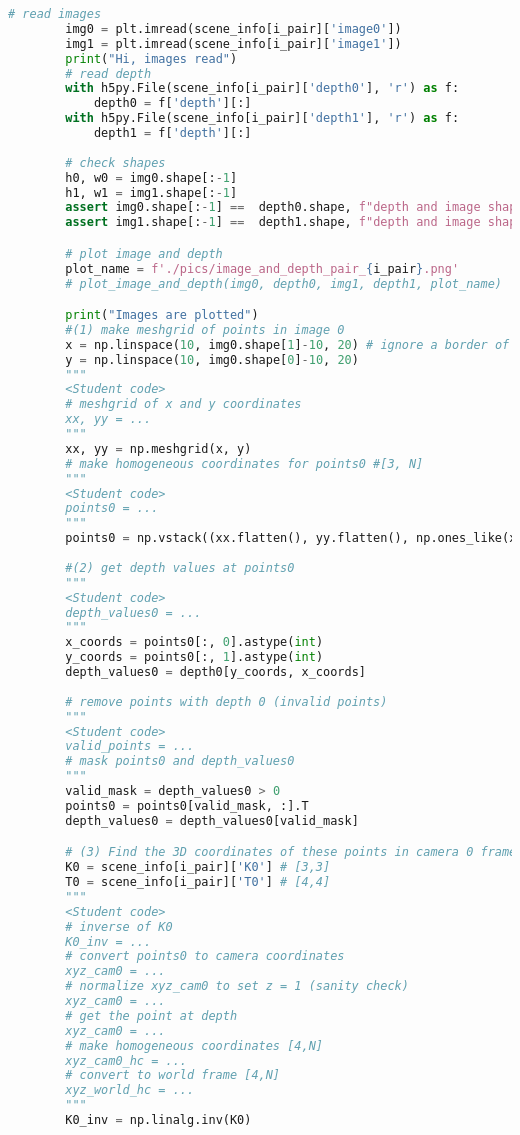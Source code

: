 \documentclass{article}
\begin{document}
\begin{lstlisting}[language=Python]
        # read images
        img0 = plt.imread(scene_info[i_pair]['image0'])
        img1 = plt.imread(scene_info[i_pair]['image1'])
        print("Hi, images read")
        # read depth
        with h5py.File(scene_info[i_pair]['depth0'], 'r') as f:
            depth0 = f['depth'][:]
        with h5py.File(scene_info[i_pair]['depth1'], 'r') as f:
            depth1 = f['depth'][:]
            
        # check shapes
        h0, w0 = img0.shape[:-1]
        h1, w1 = img1.shape[:-1]
        assert img0.shape[:-1] ==  depth0.shape, f"depth and image shapes do not match: {img0}, {depth0}"
        assert img1.shape[:-1] ==  depth1.shape, f"depth and image shapes do not match: {img1}, {depth1}"

        # plot image and depth            
        plot_name = f'./pics/image_and_depth_pair_{i_pair}.png'
        # plot_image_and_depth(img0, depth0, img1, depth1, plot_name)      

        print("Images are plotted")
        #(1) make meshgrid of points in image 0
        x = np.linspace(10, img0.shape[1]-10, 20) # ignore a border of 10 pxls
        y = np.linspace(10, img0.shape[0]-10, 20)
        """
        <Student code>
        # meshgrid of x and y coordinates
        xx, yy = ...
        """
        xx, yy = np.meshgrid(x, y)
        # make homogeneous coordinates for points0 #[3, N]
        """
        <Student code>
        points0 = ...
        """
        points0 = np.vstack((xx.flatten(), yy.flatten(), np.ones_like(xx.flatten()))).transpose(1, 0)
        
        #(2) get depth values at points0
        """
        <Student code>
        depth_values0 = ...
        """
        x_coords = points0[:, 0].astype(int)
        y_coords = points0[:, 1].astype(int)
        depth_values0 = depth0[y_coords, x_coords]
        
        # remove points with depth 0 (invalid points)
        """
        <Student code>
        valid_points = ...
        # mask points0 and depth_values0
        """
        valid_mask = depth_values0 > 0
        points0 = points0[valid_mask, :].T
        depth_values0 = depth_values0[valid_mask]

        # (3) Find the 3D coordinates of these points in camera 0 frame
        K0 = scene_info[i_pair]['K0'] # [3,3]
        T0 = scene_info[i_pair]['T0'] # [4,4]
        """
        <Student code>
        # inverse of K0
        K0_inv = ...
        # convert points0 to camera coordinates
        xyz_cam0 = ...
        # normalize xyz_cam0 to set z = 1 (sanity check)
        xyz_cam0 = ...
        # get the point at depth
        xyz_cam0 = ...
        # make homogeneous coordinates [4,N]
        xyz_cam0_hc = ...
        # convert to world frame [4,N]
        xyz_world_hc = ...
        """
        K0_inv = np.linalg.inv(K0)
        

\end{lstlisting}
\end{document}
